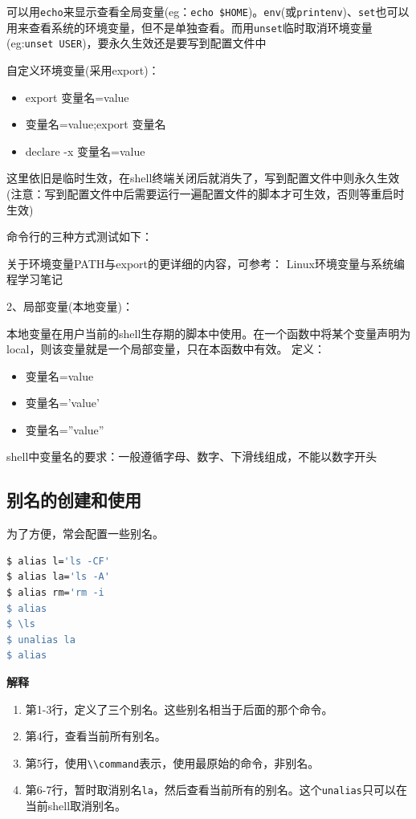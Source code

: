 \documentclass[doctor,openright,twoside]{sjtuthesis}
\providecommand{\tightlist}{%
    \setlength{\itemsep}{0pt}\setlength{\parskip}{0pt}}
\newcommand{\passthrough}[1]{#1}
\theoremstyle{plain}
\theoremstyle{definition}
\theoremstyle{remark}
\theoremstyle{ocrenumbox}
\theoremstyle{plain}
\begin{document}
可以用\passthrough{\lstinline!echo!}来显示查看全局变量(eg：\passthrough{\lstinline!echo $HOME!})。\passthrough{\lstinline!env!}(或\passthrough{\lstinline!printenv!})、\passthrough{\lstinline!set!}也可以用来查看系统的环境变量，但不是单独查看。而用\passthrough{\lstinline!unset!}临时取消环境变量(eg:\passthrough{\lstinline!unset USER!})，要永久生效还是要写到配置文件中

自定义环境变量(采用export)：

\begin{itemize}
\tightlist
\item
  export 变量名=value
\item
  变量名=value;export 变量名
\item
  declare -x 变量名=value
\end{itemize}

这里依旧是临时生效，在shell终端关闭后就消失了，写到配置文件中则永久生效(注意：写到配置文件中后需要运行一遍配置文件的脚本才可生效，否则等重启时生效)

命令行的三种方式测试如下：

关于环境变量PATH与export的更详细的内容，可参考：
Linux环境变量与系统编程学习笔记

2、局部变量(本地变量)：

本地变量在用户当前的shell生存期的脚本中使用。在一个函数中将某个变量声明为local，则该变量就是一个局部变量，只在本函数中有效。
定义：

\begin{itemize}
\tightlist
\item
  变量名=value
\item
  变量名='value'
\item
  变量名=''value''
\end{itemize}

shell中变量名的要求：一般遵循字母、数字、下滑线组成，不能以数字开头

\subsection{别名的创建和使用}

为了方便，常会配置一些别名。

\begin{lstlisting}[language=bash]
$ alias l='ls -CF'
$ alias la='ls -A'
$ alias rm='rm -i
$ alias
$ \ls
$ unalias la
$ alias
\end{lstlisting}

\textbf{解释}

\begin{enumerate}
\def\labelenumi{\arabic{enumi}.}
\tightlist
\item
  第1-3行，定义了三个别名。这些别名相当于后面的那个命令。
\item
  第4行，查看当前所有别名。
\item
  第5行，使用\passthrough{\lstinline!\\command!}表示，使用最原始的命令，非别名。
\item
  第6-7行，暂时取消别名\passthrough{\lstinline!la!}，然后查看当前所有的别名。这个\passthrough{\lstinline!unalias!}只可以在当前shell取消别名。
\end{enumerate}
\end{document}
